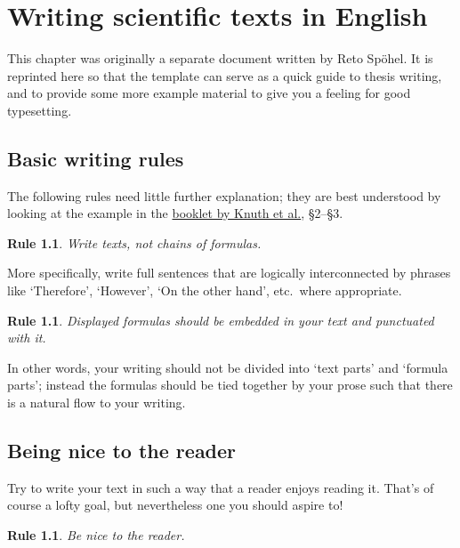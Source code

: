 \chapter{Writing scientific texts in English}

This chapter was originally a separate document written by Reto
Spöhel.  It is reprinted here so that the template can serve as a
quick guide to thesis writing, and to provide some more example
material to give you a feeling for good typesetting.

\theoremstyle{plain}
\theoremsymbol{}
\newtheorem{Rule}[theorem]{Rule}

\section{Basic writing rules}

The following rules need little further explanation; they are best
understood by looking at the example in the \href{https://cadmo.ethz.ch/education/thesis/mathwriting.pdf}{booklet by Knuth et al.},
§2--§3.

\begin{Rule}
  Write texts, not chains of formulas.
\end{Rule}

More specifically, write full sentences that are logically
interconnected by phrases like `Therefore', `However', `On the other
hand', etc.\ where appropriate.

\begin{Rule}
  Displayed formulas should be embedded in your text and punctuated
  with it.
\end{Rule}

In other words, your writing should not be divided into `text parts'
and `formula parts'; instead the formulas should be tied together by
your prose such that there is a natural flow to your writing.

\section{Being nice to the reader}

Try to write your text in such a way that a reader enjoys reading
it. That's of course a lofty goal, but nevertheless one you should
aspire to!

\begin{Rule}
  Be nice to the reader.
\end{Rule}

